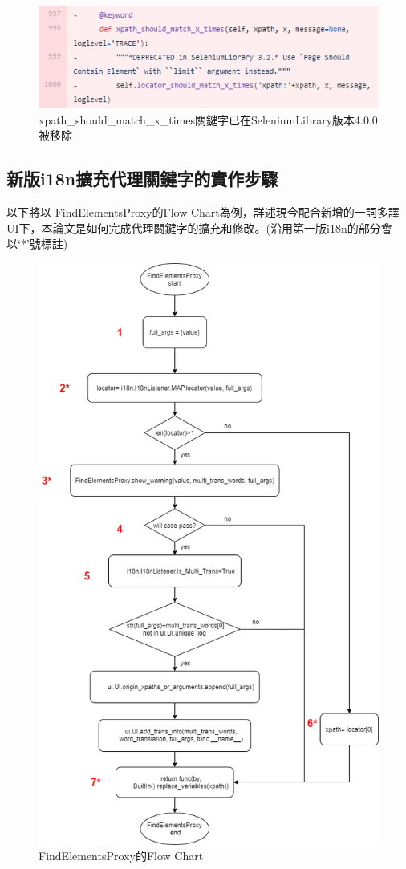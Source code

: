 \begin{figure}[H]
    \centering
    \includegraphics[width= .9\textwidth]{../論文截圖/remove xpath_should_match_x_times.png}
    \caption{xpath\_should\_match\_x\_times關鍵字已在SeleniumLibrary版本4.0.0被移除}
    \label{removexpath_should_match_x_times}
\end{figure}

\subsection{新版i18n擴充代理關鍵字的實作步驟}

以下將以 FindElementsProxy的Flow Chart為例，詳述現今配合新增的一詞多譯UI下，本論文是如何完成代理關鍵字的擴充和修改。(沿用第一版i18n的部分會以‘*’號標註)

\begin{figure}[H]
    \includegraphics[width= .85\textwidth]{../UML/i18n flow chart-FindElementsProxy.png}
    \caption{FindElementsProxy的Flow Chart}
    \label{FindElementsProxy的Flow Chart}
\end{figure}

